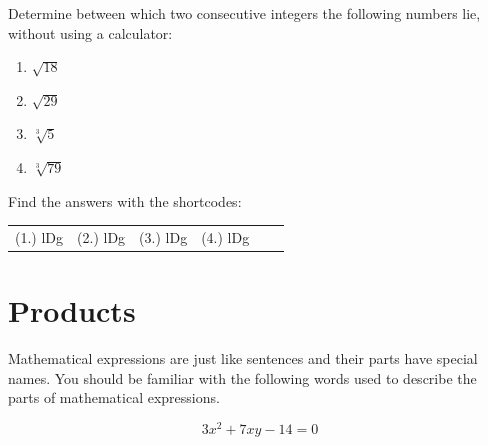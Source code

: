 \begin{exercises}{}
 {
Determine between which two consecutive integers the following numbers lie, without using a calculator:
\begin{enumerate}[itemsep=5pt, label=\textbf{\arabic*}. ]
\item $\sqrt{18}$
\item $\sqrt{29}$
\item $\sqrt[3]{5}$
\item $\sqrt[3]{79}$

\end{enumerate}
\practiceinfo 
\par {} Find the answers with the shortcodes:
 \par \begin{tabular}[h]{cccccc}
 (1.) lDg  &  (2.) lDg  &  (3.) lDg  & (4.) lDg &  \end{tabular}
}
\end{exercises}



\section{Products}
\setcounter{figure}{1}
\setcounter{subfigure}{1}
%   
\nopagebreak
Mathematical expressions are just like sentences and their parts have special names. You should be familiar with the following words used to describe the parts of  mathematical expressions.\par 

\begin{equation*}
3x^2 + 7xy -14 = 0
\end{equation*}



